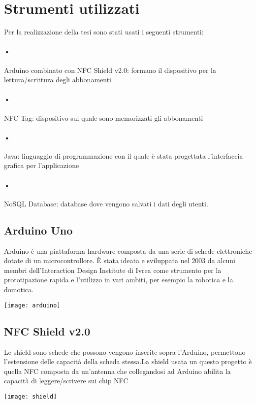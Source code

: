 \section{Strumenti utilizzati}

\hspace{\parindent}Per la realizzazione della tesi sono stati usati i seguenti strumenti:
\paragraph{•} Arduino combinato con NFC Shield v2.0: formano il dispositivo per la lettura/scrittura degli abbonamenti
\paragraph{•} NFC Tag: dispositivo sul quale sono memorizzati gli abbonamenti
\paragraph{•} Java: linguaggio di programmazione con il quale è stata progettata l'interfaccia grafica per l'applicazione
\paragraph{•} NoSQL Database: database dove vengono salvati i dati degli utenti.

\subsection{Arduino Uno}
\hspace{\parindent} Arduino è una piattaforma hardware composta da una serie di schede elettroniche dotate di un microcontrollore. È stata ideata e sviluppata nel 2003 da alcuni membri dell'Interaction Design Institute di Ivrea come strumento per la prototipazione rapida e l'utilizzo in vari ambiti, per esempio la robotica e la domotica.
\begin{center}
\texttt{[image: arduino]}
\end{center}
\subsection{NFC Shield v2.0}

\hspace{\parindent}Le shield sono schede che possono vengono inserite sopra l'Arduino, permettono l'estensione delle capacità della scheda stessa.La shield usata un questo progetto è quella NFC composta da un'antenna che collegandosi ad Arduino abilita la capacità di leggere/scrivere sui chip NFC
\begin{center}
\texttt{[image: shield]}
\end{center}
